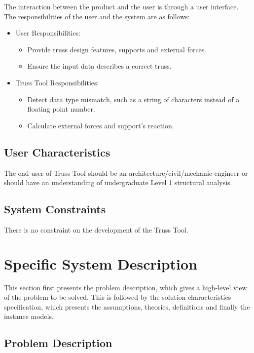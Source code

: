 \documentclass[12pt]{article}
\begin{document}
The interaction between the product and the user is through a user interface. The responsibilities of the user and the system are as follows:
\begin{itemize}
\item User Responsibilities:
\begin{itemize}
\item Provide truss design features, supports and external forces. 
\item Ensure the input data describes a correct truss.

\end{itemize}
\item Truss Tool Responsibilities:
\begin{itemize}
\item Detect data type mismatch, such as a string of characters instead of a  floating point number.
\item Calculate external forces and support's reaction.
\end{itemize}
\end{itemize}


\subsection{User Characteristics} \label{SecUserCharacteristics}

The end user of Truss Tool should be an architecture/civil/mechanic engineer or should have an understanding of undergraduate Level 1 structural analysis.

\subsection{System Constraints}

There is no constraint on the development of the Truss Tool.


\section{Specific System Description}

This section first presents the problem description, which gives a high-level view of the problem to be solved.  This is followed by the solution characteristics specification, which presents the assumptions, theories, definitions and finally the instance models.


\subsection{Problem Description} \label{Sec_pd}
\end{document}
